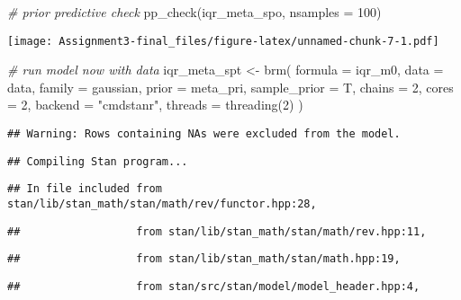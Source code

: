 \documentclass[
]{article}
\newenvironment{Shaded}{\begin{snugshade}}{\end{snugshade}}
\newcommand{\AttributeTok}[1]{\textcolor[rgb]{0.77,0.63,0.00}{#1}}
\newcommand{\CommentTok}[1]{\textcolor[rgb]{0.56,0.35,0.01}{\textit{#1}}}
\newcommand{\DecValTok}[1]{\textcolor[rgb]{0.00,0.00,0.81}{#1}}
\newcommand{\FunctionTok}[1]{\textcolor[rgb]{0.00,0.00,0.00}{#1}}
\newcommand{\NormalTok}[1]{#1}
\newcommand{\OtherTok}[1]{\textcolor[rgb]{0.56,0.35,0.01}{#1}}
\newcommand{\StringTok}[1]{\textcolor[rgb]{0.31,0.60,0.02}{#1}}
\begin{document}
\begin{Shaded}
\begin{Highlighting}[]
\CommentTok{\# prior predictive check}
\FunctionTok{pp\_check}\NormalTok{(iqr\_meta\_spo, }\AttributeTok{nsamples =} \DecValTok{100}\NormalTok{)}
\end{Highlighting}
\end{Shaded}

\texttt{[image: Assignment3-final\_files/figure-latex/unnamed-chunk-7-1.pdf]}

\begin{Shaded}
\begin{Highlighting}[]
\CommentTok{\# run model now with data}
\NormalTok{iqr\_meta\_spt }\OtherTok{\textless{}{-}} \FunctionTok{brm}\NormalTok{(}
  \AttributeTok{formula =}\NormalTok{ iqr\_m0,}
  \AttributeTok{data =}\NormalTok{ data,}
  \AttributeTok{family =}\NormalTok{ gaussian,}
  \AttributeTok{prior =}\NormalTok{ meta\_pri,}
  \AttributeTok{sample\_prior =}\NormalTok{ T,}
  \AttributeTok{chains =} \DecValTok{2}\NormalTok{,}
  \AttributeTok{cores =} \DecValTok{2}\NormalTok{,}
  \AttributeTok{backend =} \StringTok{"cmdstanr"}\NormalTok{,}
  \AttributeTok{threads =} \FunctionTok{threading}\NormalTok{(}\DecValTok{2}\NormalTok{)}
\NormalTok{)}
\end{Highlighting}
\end{Shaded}

\begin{verbatim}
## Warning: Rows containing NAs were excluded from the model.
\end{verbatim}

\begin{verbatim}
## Compiling Stan program...
\end{verbatim}

\begin{verbatim}
## In file included from stan/lib/stan_math/stan/math/rev/functor.hpp:28,
\end{verbatim}

\begin{verbatim}
##                  from stan/lib/stan_math/stan/math/rev.hpp:11,
\end{verbatim}

\begin{verbatim}
##                  from stan/lib/stan_math/stan/math.hpp:19,
\end{verbatim}

\begin{verbatim}
##                  from stan/src/stan/model/model_header.hpp:4,
\end{verbatim}
\end{document}

